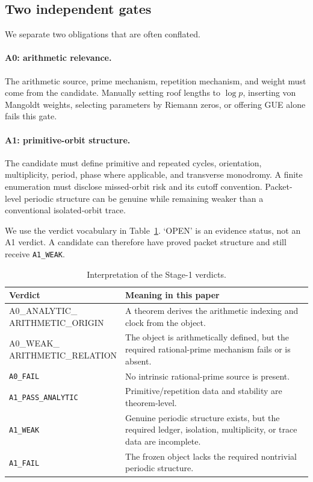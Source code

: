 \documentclass[11pt]{article}
\theoremstyle{definition}
\theoremstyle{remark}
\begin{document}
\subsection{Two independent gates}

We separate two obligations that are often conflated.

\paragraph{A0: arithmetic relevance.}
The arithmetic source, prime mechanism, repetition mechanism, and weight must
come from the candidate.  Manually setting roof lengths to \(\log p\),
inserting von Mangoldt weights, selecting parameters by Riemann zeros, or
offering GUE alone fails this gate.

\paragraph{A1: primitive-orbit structure.}
The candidate must define primitive and repeated cycles, orientation,
multiplicity, period, phase where applicable, and transverse monodromy.  A
finite enumeration must disclose missed-orbit risk and its cutoff convention.
Packet-level periodic structure can be genuine while remaining weaker than a
conventional isolated-orbit trace.

We use the verdict vocabulary in Table~\ref{tab:verdicts}.  `OPEN' is an
evidence status, not an A1 verdict.  A candidate can therefore have proved
packet structure and still receive \texttt{A1\_WEAK}.

\begin{table}[ht]
\centering
\caption{Interpretation of the Stage-1 verdicts.}
\label{tab:verdicts}
\begin{tabular}{p{}p{}}
\toprule
Verdict & Meaning in this paper\\
\midrule
\shortstack[l]{\ttfamily A0\_ANALYTIC\_\\ARITHMETIC\_ORIGIN} & A theorem derives the arithmetic indexing and clock from the object.\\
\shortstack[l]{\ttfamily A0\_WEAK\_\\ARITHMETIC\_RELATION} & The object is arithmetically defined, but the required rational-prime mechanism fails or is absent.\\
\texttt{A0\_FAIL} & No intrinsic rational-prime source is present.\\
\texttt{A1\_PASS\_ANALYTIC} & Primitive/repetition data and stability are theorem-level.\\
\texttt{A1\_WEAK} & Genuine periodic structure exists, but the required ledger, isolation, multiplicity, or trace data are incomplete.\\
\texttt{A1\_FAIL} & The frozen object lacks the required nontrivial periodic structure.\\
\bottomrule
\end{tabular}
\end{table}
\end{document}
